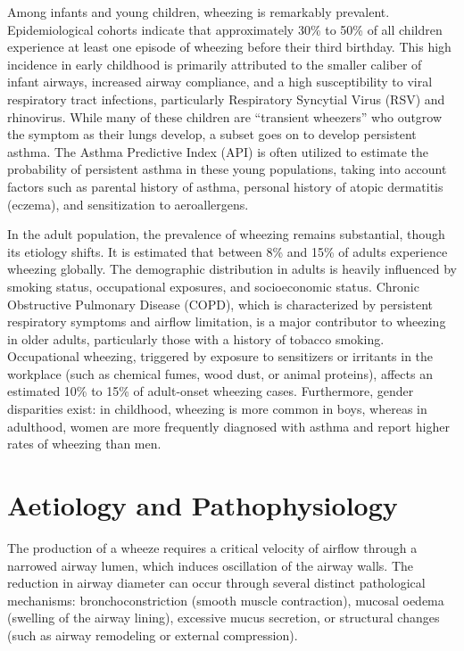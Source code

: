 Among infants and young children, wheezing is remarkably prevalent. Epidemiological cohorts indicate that approximately 30\% to 50\% of all children experience at least one episode of wheezing before their third birthday. This high incidence in early childhood is primarily attributed to the smaller caliber of infant airways, increased airway compliance, and a high susceptibility to viral respiratory tract infections, particularly Respiratory Syncytial Virus (RSV) and rhinovirus. While many of these children are ``transient wheezers'' who outgrow the symptom as their lungs develop, a subset goes on to develop persistent asthma. The Asthma Predictive Index (API) is often utilized to estimate the probability of persistent asthma in these young populations, taking into account factors such as parental history of asthma, personal history of atopic dermatitis (eczema), and sensitization to aeroallergens.

In the adult population, the prevalence of wheezing remains substantial, though its etiology shifts. It is estimated that between 8\% and 15\% of adults experience wheezing globally. The demographic distribution in adults is heavily influenced by smoking status, occupational exposures, and socioeconomic status. Chronic Obstructive Pulmonary Disease (COPD), which is characterized by persistent respiratory symptoms and airflow limitation, is a major contributor to wheezing in older adults, particularly those with a history of tobacco smoking. Occupational wheezing, triggered by exposure to sensitizers or irritants in the workplace (such as chemical fumes, wood dust, or animal proteins), affects an estimated 10\% to 15\% of adult-onset wheezing cases. Furthermore, gender disparities exist: in childhood, wheezing is more common in boys, whereas in adulthood, women are more frequently diagnosed with asthma and report higher rates of wheezing than men.

\section*{Aetiology and Pathophysiology}
The production of a wheeze requires a critical velocity of airflow through a narrowed airway lumen, which induces oscillation of the airway walls. The reduction in airway diameter can occur through several distinct pathological mechanisms: bronchoconstriction (smooth muscle contraction), mucosal oedema (swelling of the airway lining), excessive mucus secretion, or structural changes (such as airway remodeling or external compression).

